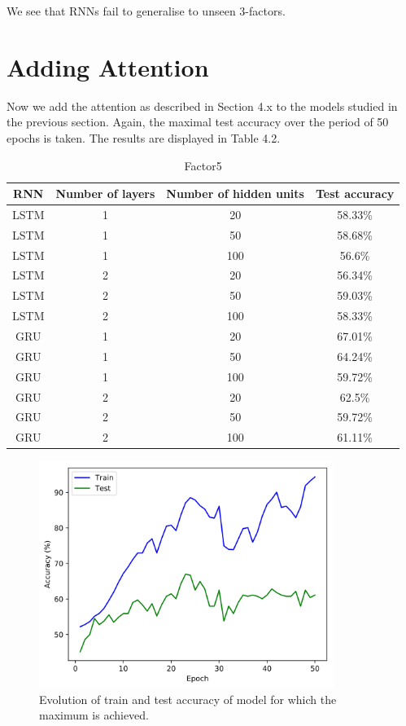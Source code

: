 \documentclass[titlepage]{report}
\newcommand{\otoprule}{\midrule[\heavyrulewidth]}
\begin{document}
\noindent
We see that RNNs fail to generalise to unseen 3-factors.

\section{Adding Attention}

Now we add the attention as described in Section 4.x to the models studied in the previous section. Again, the maximal test accuracy over the period of 50 epochs is taken. The results are displayed in Table 4.2.

\begin{table}[H]
\caption{Factor5}
\centering
\begin{tabular}{cccc}
\toprule%
\textbf{RNN} & \textbf{Number of layers} & \textbf{Number of hidden units} & \textbf{Test accuracy} \\
\otoprule%
LSTM & 1 & 20 & 58.33\% \\
LSTM & 1 & 50 & 58.68\% \\
LSTM & 1 & 100 & 56.6\% \\
LSTM & 2 & 20 & 56.34\% \\
LSTM & 2 & 50 & 59.03\% \\
LSTM & 2 & 100 & 58.33\% \\
GRU & 1 & 20 & 67.01\% \\ 
GRU & 1 & 50 & 64.24\% \\
GRU & 1 & 100 & 59.72\% \\
GRU & 2 & 20 & 62.5\% \\
GRU & 2 & 50 & 59.72\% \\
GRU & 2 & 100 & 61.11\% \\
\bottomrule
\end{tabular}
\end{table}

\begin{figure}[H]
\centering
\includegraphics[width = 96mm]{figures/plots/attn_gru_1_20_6701}
\caption{Evolution of train and test accuracy of model for which the maximum is achieved.}
\end{figure}
\end{document}
